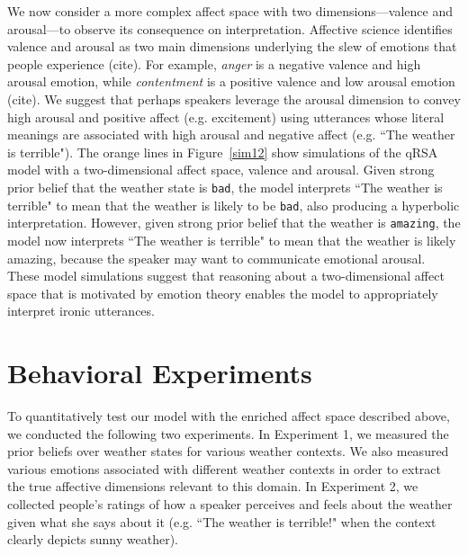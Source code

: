 \documentclass[10pt,letterpaper]{article}
\begin{document}
We now consider a more complex affect space with two dimensions---valence and arousal---to observe its consequence on interpretation. Affective science identifies valence and arousal as two main dimensions underlying the slew of emotions that people experience (cite). For example, \emph{anger} is a negative valence and high arousal emotion, while \emph{contentment} is a positive valence and low arousal emotion (cite). We suggest that perhaps speakers leverage the arousal dimension to convey high arousal and positive affect (e.g. excitement) using utterances whose literal meanings are associated with high arousal and negative affect (e.g. ``The weather is terrible"). The orange lines in Figure~\ref{sim12} show simulations of the qRSA model with a two-dimensional affect space, valence and arousal. Given strong prior belief that the weather state is \texttt{bad}, the model interprets ``The weather is terrible" to mean that the weather is likely to be \texttt{bad}, also producing a hyperbolic interpretation. However, given strong prior belief that the weather is \texttt{amazing}, the model now interprets ``The weather is terrible" to mean that the weather is likely amazing, because the speaker may want to communicate emotional arousal. These model simulations suggest that reasoning about a two-dimensional affect space that is motivated by emotion theory enables the model to appropriately interpret ironic utterances. 



\section{Behavioral Experiments}
To quantitatively test our model with the enriched affect space described above, we conducted the following two experiments. In Experiment 1, we measured the prior beliefs over weather states for various weather contexts. We also measured various emotions associated with different weather contexts in order to extract the true affective dimensions relevant to this domain. In Experiment 2, we collected people's ratings of how a speaker perceives and feels about the weather given what she says about it (e.g. ``The weather is terrible!" when the context clearly depicts sunny weather).
\end{document}
